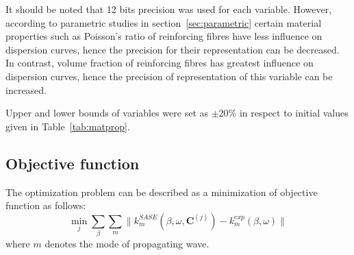 \documentclass[preprint,12pt]{elsarticle}
\newcommand{\matr}[1]{\mathbf{#1}} %
\begin{document}
    It should be noted that 12 bits precision was used for each variable. However, according to parametric studies in section~\ref{sec:parametric} certain material properties such as Poisson's ratio of reinforcing fibres have less influence on dispersion curves, hence the precision for their representation can be decreased. In contrast, volume fraction of reinforcing fibres has greatest influence on dispersion curves, hence the precision of representation of this variable can be increased.
  
	Upper and lower bounds of variables were set as  $\pm$20\% in respect to initial values given in Table~\ref{tab:matprop}.
	\subsection{Objective function}
	The optimization problem can be described as a minimization of objective function as follows:
	\begin{equation}
	\min_j \sum_{\beta}\sum_{m} \| k^{SASE}_{m}(\beta, \omega,\matr{C}^{(j)}) -k^{exp}_{m}(\beta,\omega) \|
	\end{equation}
	where $m$ denotes the mode of propagating wave.
\end{document}
